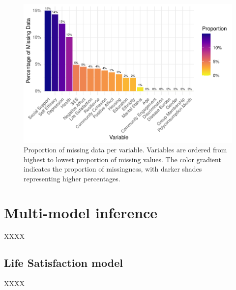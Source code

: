 \documentclass[
  bookmarksnumbered]{article}
\begin{document}
\begin{figure}
\centering
\includegraphics{Supplementary_material_files/figure-latex/fig-missing-data-1.pdf}
\caption{\label{fig:fig-missing-data}Proportion of missing data per variable. Variables are ordered from highest to lowest proportion of missing values. The color gradient indicates the proportion of missingness, with darker shades representing higher percentages.}
\end{figure}

\section{Multi-model inference}\label{multi-model-inference}

XXXX

\subsection{Life Satisfaction model}\label{life-satisfaction-model}

XXXX
\end{document}
